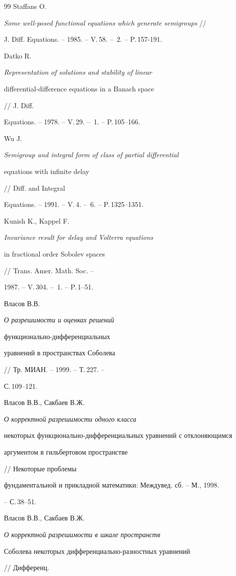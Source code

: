 \begin{thebibliography}{99}
Staffans O.


{\em Some well-posed functional equations which generate semigroups} //


J. Diff. Equations. -- 1985. -- V.\,58. -- \No\,2. -- P.\,157-191.




Datko R. {\em Representation of solutions and stability of linear


differential-difference equations in a Banach space} // J. Diff.


Equations. -- 1978. -- V.\,29. -- \No\,1. -- P.\,105--166.




Wu J. {\em Semigroup and integral form of class of partial differential


equations with infinite delay} // Diff. and Integral


Equations. -- 1991. -- V.\,4. -- \No\,6. -- P.\,1325--1351.




Kunish K., Kappel F. {\em Invariance result for delay and Volterra equations


in fractional order Sobolev spaces} // Trans. Amer. Math. Soc. --


1987. -- V.\,304. -- \No\,1. -- P.\,1--51.




Власов В.В. {\em О разрешимости и оценках решений 


функционально-дифференциальных


уравнений в пространствах Соболева} // Тр. МИАН. -- 1999. -- Т.\,227. --


С.\,109--121.




Власов В.В., Сакбаев В.Ж. {\em О корректной разрешимости одного класса 


некоторых функционально-дифференциальных уравнений с отклоняющимся


аргументом в гильбертовом пространстве} // Некоторые проблемы


фундаментальной и прикладной математики: Междувед. сб. -- М., 1998.


-- С.\,38--51.




Власов В.В., Сакбаев В.Ж. {\em О корректной разрешимости в шкале пространств


Соболева некоторых дифференциально-разностных уравнений} // Дифференц.



\end{thebibliography}
